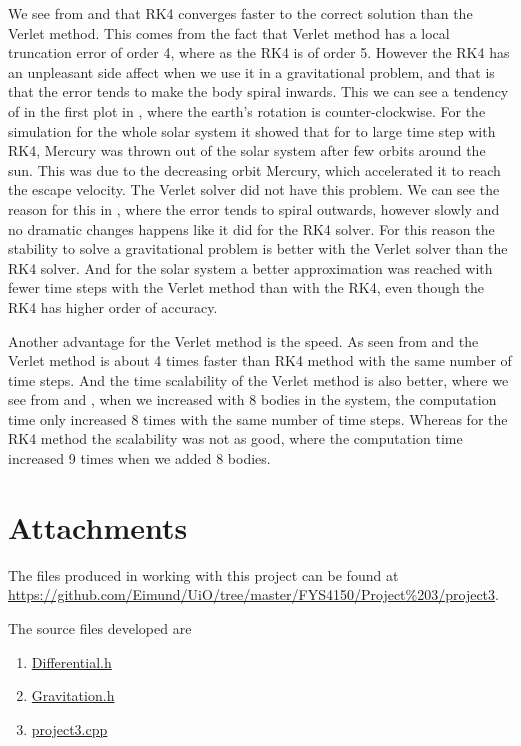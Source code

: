 \documentclass[11pt,english,a4paper]{article}
\begin{document}
\begin{flushleft}
We see from  and  that RK4 converges faster to the correct solution than the Verlet method. This comes from the fact that Verlet method has a local truncation error of order 4, where as the RK4 is of order 5. However the RK4 has an unpleasant side affect when we use it in a gravitational problem, and that is that the error tends to make the body spiral inwards. This we can see a tendency of in the first plot in , where the earth's rotation is counter-clockwise. For the simulation for the whole solar system it showed that for to large time step with RK4, Mercury was thrown out of the solar system after few orbits around the sun. This was due to the decreasing orbit Mercury, which accelerated it to reach the escape velocity. The Verlet solver did not have this problem. We can see the reason for this in , where the error tends to spiral outwards, however slowly and no dramatic changes happens like it did for the RK4 solver. For this reason the stability to solve a gravitational problem is better with the Verlet solver than the RK4 solver. And for the solar system a better approximation was reached with fewer time steps with the Verlet method than with the RK4, even though the RK4 has higher order of accuracy. \linebreak

Another advantage for the Verlet method is the speed. As seen from  and  the Verlet method is about 4 times faster than RK4 method with the same number of time steps. And the time scalability of the Verlet method is also better, where we see from  and , when we increased with 8 bodies in the system, the computation time only increased 8 times with the same number of time steps. Whereas for the RK4 method the scalability was not as good, where the computation time increased 9 times when we added 8 bodies.

\section{Attachments}

The files produced in working with this project can be found at \href{https://github.com/Eimund/UiO/tree/master/FYS4150/Project\%203/project3}{https://github.com/Eimund/UiO/tree/master/FYS4150/Project\%203/project3}.\linebreak

The source files developed are

\begin{enumerate}
\item{\href{https://github.com/Eimund/UiO/blob/master/FYS4150/Project\%203/project3/Differential.h}{Differential.h}}
\item{\href{https://github.com/Eimund/UiO/blob/master/FYS4150/Project\%203/project3/Gravitation.h}{Gravitation.h}}
\item{\href{https://github.com/Eimund/UiO/blob/master/FYS4150/Project\%203/project3/project3.cpp}{project3.cpp}}
\end{enumerate}


\end{flushleft}
\end{document}

